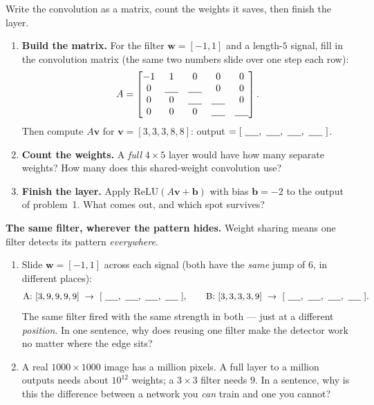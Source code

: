 \documentclass[10pt]{article}
\newcommand{\vv}{\mathbf{v}}
\newcommand{\bb}{\mathbf{b}}
\newcommand{\ww}{\mathbf{w}}
\newcommand{\relu}{\mathrm{ReLU}}
\begin{document}
\begin{tcolorbox}[colback=white, colframe=black!40, title=\textbf{Tier A --- Approaching Proficiency},
    fonttitle=\bfseries, arc=1.5mm, left=3mm, right=3mm, top=2mm, bottom=2mm, breakable]
Write the convolution as a matrix, count the weights it saves, then finish the layer.
\begin{enumerate}[leftmargin=1.7em, itemsep=9pt]
  \item \textbf{Build the matrix.} For the filter $\ww=[-1,1]$ and a length-$5$ signal, fill in the
        convolution matrix (the same two numbers slide over one step each row):
        \[ A=\begin{bmatrix} -1 & 1 & 0 & 0 & 0\\ 0 & \blank{0.5cm} & \blank{0.5cm} & 0 & 0\\
             0 & 0 & \blank{0.5cm} & \blank{0.5cm} & 0\\ 0 & 0 & 0 & \blank{0.5cm} & \blank{0.5cm} \end{bmatrix}. \]
        Then compute $A\vv$ for $\vv=[3,3,3,8,8]$: \quad output $=[\ \blank{0.5cm},\ \blank{0.5cm},\ \blank{0.5cm},\ \blank{0.5cm}\ ]$.
  \item \textbf{Count the weights.} A \emph{full} $4\times5$ layer would have how many separate weights? How
        many does this shared-weight convolution use? \writeline
  \item \textbf{Finish the layer.} Apply $\relu(A\vv+\bb)$ with bias $\bb=-2$ to the output of problem~1.
        What comes out, and which spot survives? \writeline
\end{enumerate}
\end{tcolorbox}

\begin{tcolorbox}[colback=white, colframe=black!40, title=\textbf{Tier E --- Extension},
    fonttitle=\bfseries, arc=1.5mm, left=3mm, right=3mm, top=2mm, bottom=2mm, breakable]
\textbf{The same filter, wherever the pattern hides.} Weight sharing means one filter detects its pattern
\emph{everywhere}.
\begin{enumerate}[leftmargin=1.7em, itemsep=9pt]
  \item Slide $\ww=[-1,1]$ across each signal (both have the \emph{same} jump of $6$, in different places):
        \[ \text{A: }[3,9,9,9,9]\ \to\ [\ \blank{0.5cm},\ \blank{0.5cm},\ \blank{0.5cm},\ \blank{0.5cm}\ ],
           \qquad \text{B: }[3,3,3,3,9]\ \to\ [\ \blank{0.5cm},\ \blank{0.5cm},\ \blank{0.5cm},\ \blank{0.5cm}\ ]. \]
        The same filter fired with the same strength in both --- just at a different \emph{position}. In one
        sentence, why does reusing one filter make the detector work no matter where the edge sits? \writeline
  \item A real $1000\times1000$ image has a million pixels. A full layer to a million outputs needs about
        $10^{12}$ weights; a $3\times3$ filter needs $9$. In a sentence, why is this the difference between a
        network you \emph{can} train and one you cannot? \writeline
\end{enumerate}
\end{tcolorbox}
\end{document}
